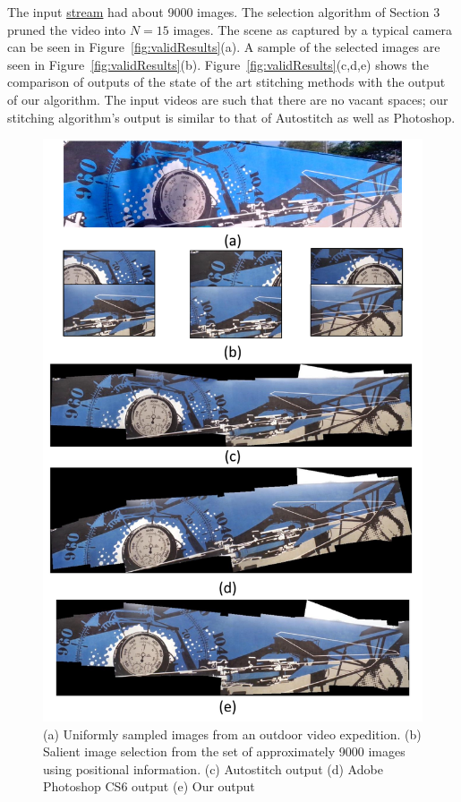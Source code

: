 \documentclass[10pt,twocolumn,letterpaper]{article}
\begin{document}
The input \href{videos/lady2.avi}{stream} had about 9000 images. The
selection algorithm of Section 3 pruned the video into $N=15$ images. The scene as captured by a typical camera 
can  be seen in
Figure~\ref{fig:validResults}(a). A sample of the
selected images are seen in Figure~\ref{fig:validResults}(b).
Figure~\ref{fig:validResults}(c,d,e) shows the comparison of outputs of the state
of the art stitching methods with the output of our algorithm. The input videos
are such that there are no vacant
spaces; our stitching algorithm's output is similar to that of Autostitch as
well as Photoshop.

\begin{figure}[h!]
\centering
\includegraphics[width=0.8\linewidth]{figures/longwall.pdf}
\caption{ (a) Uniformly sampled images from an outdoor video
  expedition.  (b) Salient image selection from the set of
  approximately 9000 images using positional information. (c) Autostitch output
  (d) Adobe Photoshop CS6 output (e) Our output }
\label{fig:validResults1}
\end{figure}
\end{document}
